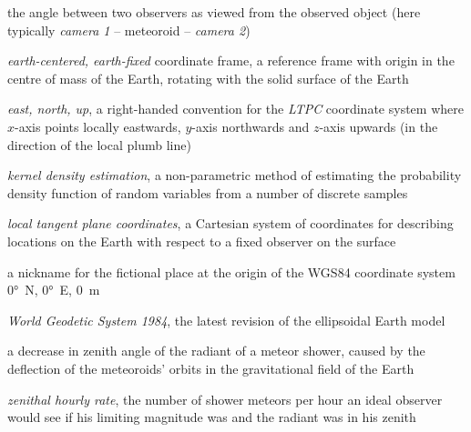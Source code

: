 \begin{description}[labelindent=0mm, leftmargin=40mm]
    \item[convergence angle]
        the angle between two observers as viewed from the observed object
        (here typically \emph{camera 1} -- meteoroid -- \emph{camera 2})
    \item[ECEF]
        \emph{earth-centered, earth-fixed} coordinate frame, a reference frame with origin
        in the centre of mass of the Earth, rotating with the solid surface of the Earth
    \item[ENU]
        \emph{east, north, up}, a right-handed convention for the \emph{LTPC} coordinate system where
        $x$-axis points locally eastwards, $y$-axis northwards and $z$-axis upwards
        (in the direction of the local plumb line)
    \item[KDE]
        \emph{kernel density estimation}, a non-parametric method of estimating the probability density function
        of random variables from a number of discrete samples
    \item[LTPC]
        \emph{local tangent plane coordinates}, a Cartesian system of coordinates
        for describing locations on the Earth with respect to a fixed observer on the surface
    \item[Null Island]
        a nickname for the fictional place at the origin of the WGS84 coordinate system
        \ang{0}~N, \ang{0}~E, \SI{0}{\metre} \citep{null-island}
    \item[WGS84]
        \emph{World Geodetic System 1984}, the latest revision of the ellipsoidal Earth model \citep{nima-wgs84}
    \item[zenith attraction]
        a decrease in zenith angle of the radiant of a meteor shower,
        caused by the deflection of the meteoroids' orbits in the
        gravitational field of the Earth \citep{lovell1954}
    \item[ZHR]
        \emph{zenithal hourly rate}, the number of shower meteors per hour an ideal observer would see
        if his limiting magnitude was  and the radiant was in his zenith \citep{imo-glossary}
\end{description}
